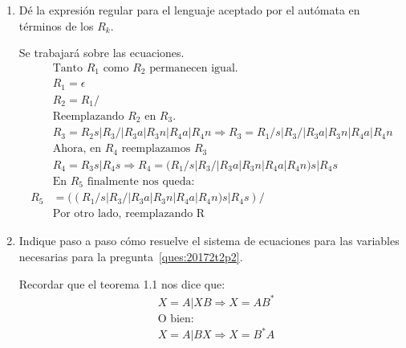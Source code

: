 \documentclass[spanish, fleqn]{article}
\begin{document}
\begin{enumerate}
  \item %
    \label{ques:20172t2p2}
    Dé la expresión regular para el lenguaje aceptado por el autómata
    en términos de los \(R_k\).
    
    Se trabajará sobre las ecuaciones.
    \begin{align*}
    &\text{Tanto $R_1$ como $R_2$ permanecen igual.}\\
    &R_{1}=\epsilon \\
    &R_{2}=R_{1}/\\
    &\text{Reemplazando $R_2$ en $R_3$.}\\
    &R_{3}=R_{2}s|R_{3}/|R_{3}a|R_{3}n|R_{4}a|R_{4}n \Rightarrow  R_{3}=R_{1}/s|R_{3}/|R_{3}a|R_{3}n|R_{4}a|R_{4}n\\
    &\text{Ahora, en $R_4$ reemplazamos $R_3$}\\
    &R_4=R_{3}s|R_{4}s \Rightarrow R_4=(R_{1}/s|R_{3}/|R_{3}a|R_{3}n|R_{4}a|R_{4}n)s|R_4s\\
    &\text{En $R_5$ finalmente nos queda:}\\
    R_{5}&=((R_{1}/s|R_{3}/|R_{3}a|R_{3}n|R_{4}a|R_{4}n)s|R_4s)/\\
    &\text{Por otro lado, reemplazando R}
    \end{align*}
        
  \item %
    Indique paso a paso cómo resuelve el sistema de ecuaciones
    para las variables necesarias para la pregunta~\ref{ques:20172t2p2}.
	
	Recordar que el teorema 1.1 nos dice que:
	\begin{align*}
	&X = A | XB \Rightarrow X = AB^*\\
	&\text{O bien:}\\
	&X = A | BX \Rightarrow X = B^*A
	\end{align*}	    
    

\end{enumerate}
\end{document}
